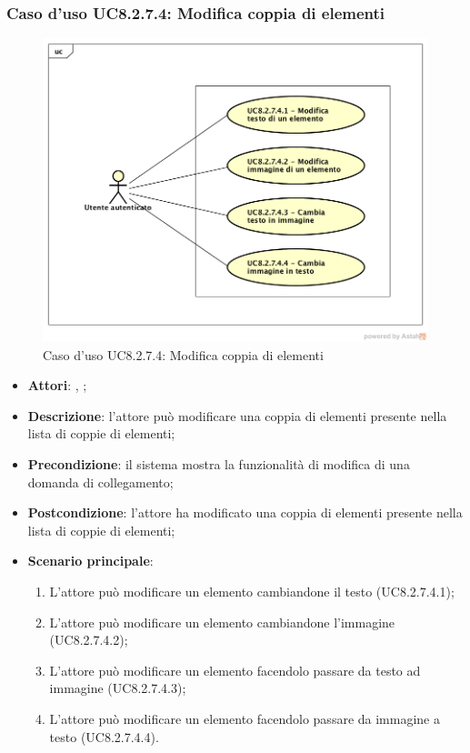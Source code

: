 	\subsubsection{Caso d'uso UC8.2.7.4: Modifica coppia di elementi}
	\label{UC8.2.7.4}
	\begin{figure}[h]
		\centering
		\includegraphics[scale=0.5,keepaspectratio]{UML/UC8_2_7_4.png}
		\caption{Caso d'uso UC8.2.7.4: Modifica coppia di elementi}
	\end{figure}
	\FloatBarrier
	\begin{itemize}
		\item \textbf{Attori}: \uau, \uaupro;
		\item \textbf{Descrizione}: l'attore può modificare una coppia di elementi presente nella lista di coppie di elementi;
		\item \textbf{Precondizione}: il sistema mostra la funzionalità di modifica di una domanda di collegamento; 
		\item \textbf{Postcondizione}: l'attore ha modificato una coppia di elementi presente nella lista di coppie di elementi; 
		\item \textbf{Scenario principale}: 
		\begin{enumerate}
			\item L'attore può modificare un elemento cambiandone il testo (UC8.2.7.4.1);
			\item L'attore può modificare un elemento cambiandone l'immagine (UC8.2.7.4.2);
			\item L'attore può modificare un elemento facendolo passare da testo ad immagine (UC8.2.7.4.3);
			\item L'attore può modificare un elemento facendolo passare da immagine a testo (UC8.2.7.4.4).	
		\end{enumerate}
	\end{itemize}
	
